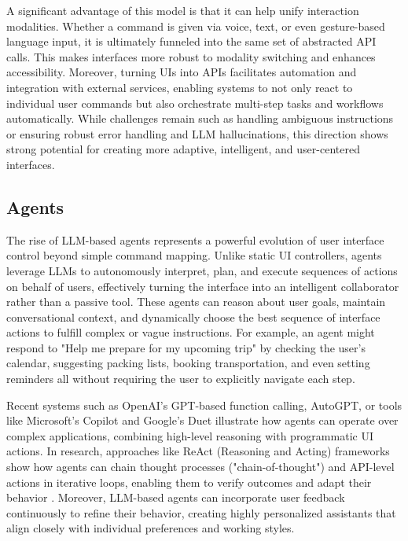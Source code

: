 \documentclass[openany]{book}
\begin{document}
A significant advantage of this model is that it can help unify interaction modalities. Whether a command is given via voice, text, or even gesture-based language input, it is ultimately funneled into the same set of abstracted API calls. This makes interfaces more robust to modality switching and enhances accessibility.
Moreover, turning UIs into APIs facilitates automation and integration with external services, enabling systems to not only react to individual user commands but also orchestrate multi-step tasks and workflows automatically. While challenges remain such as handling ambiguous instructions or ensuring robust error handling and LLM hallucinations, this direction shows strong potential for creating more adaptive, intelligent, and user-centered interfaces.

\subsection{Agents}
The rise of LLM-based agents represents a powerful evolution of user interface control beyond simple command mapping. Unlike static UI controllers, agents leverage LLMs to autonomously interpret, plan, and execute sequences of actions on behalf of users, effectively turning the interface into an intelligent collaborator rather than a passive tool.
These agents can reason about user goals, maintain conversational context, and dynamically choose the best sequence of interface actions to fulfill complex or vague instructions. For example, an agent might respond to "Help me prepare for my upcoming trip" by checking the user's calendar, suggesting packing lists, booking transportation, and even setting reminders all without requiring the user to explicitly navigate each step.

Recent systems such as OpenAI’s GPT-based function calling, AutoGPT, or tools like Microsoft’s Copilot and Google’s Duet illustrate how agents can operate over complex applications, combining high-level reasoning with programmatic UI actions. In research, approaches like ReAct (Reasoning and Acting) frameworks show how agents can chain thought processes ("chain-of-thought") and API-level actions in iterative loops, enabling them to verify outcomes and adapt their behavior \cite{yao2023react}. Moreover, LLM-based agents can incorporate user feedback continuously to refine their behavior, creating highly personalized assistants that align closely with individual preferences and working styles.
\end{document}
